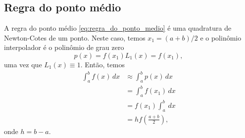 
\subsection{Regra do ponto médio}

A regra do ponto médio \eqref{eq:regra_do_ponto_medio} é uma quadratura de Newton-Cotes de um ponto. Neste caso, temos $x_1 = (a+b)/2$ e o polinômio interpolador é o polinômio de grau zero
\begin{equation}
  p(x) = f(x_1)L_1(x) = f(x_1),
\end{equation}
uma vez que $L_1(x)\equiv 1$. Então, temos
\begin{equation}
  \begin{split}
    \int_a^b f(x)\,dx &\approx \int_a^b p(x)\,dx\\
    &= \int_a^b f(x_1)\,dx\\
    &= f(x_1)\int_a^b\,dx\\
    &= hf(\frac{a+b}{2}),
  \end{split}
\end{equation}
onde $h=b-a$.

